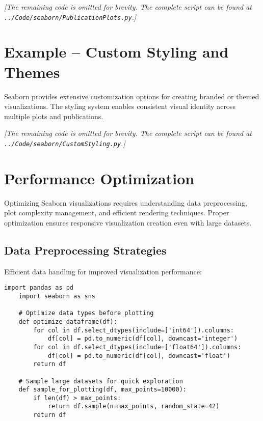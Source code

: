 

\noindent\textit{[The remaining code is omitted for brevity. The complete script can be found at \texttt{../Code/seaborn/PublicationPlots.py}.]}

\section{Example -- Custom Styling and Themes}
\label{sec:styling_example}

Seaborn provides extensive customization options for creating branded or themed visualizations. The styling system enables consistent visual identity across multiple plots and publications.



\noindent\textit{[The remaining code is omitted for brevity. The complete script can be found at \texttt{../Code/seaborn/CustomStyling.py}.]}

\section{Performance Optimization}
\label{sec:optimization}

Optimizing Seaborn visualizations requires understanding data preprocessing, plot complexity management, and efficient rendering techniques. Proper optimization ensures responsive visualization creation even with large datasets.

\subsection{Data Preprocessing Strategies}
\label{subsec:preprocessing}

Efficient data handling for improved visualization performance:

\begin{lstlisting}[language=MyPython, caption={Data Preprocessing for Performance}, label={lst:preprocessing}]
	import pandas as pd
	import seaborn as sns
	
	# Optimize data types before plotting
	def optimize_dataframe(df):
	    for col in df.select_dtypes(include=['int64']).columns:
	        df[col] = pd.to_numeric(df[col], downcast='integer')
	    for col in df.select_dtypes(include=['float64']).columns:
	        df[col] = pd.to_numeric(df[col], downcast='float')
	    return df
	
	# Sample large datasets for quick exploration
	def sample_for_plotting(df, max_points=10000):
	    if len(df) > max_points:
	        return df.sample(n=max_points, random_state=42)
	    return df
\end{lstlisting}

